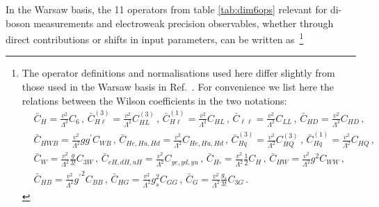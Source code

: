 \documentclass[../report.tex]{subfiles}
\begin{document}
In the Warsaw basis, the 11 operators from table \ref{tab:dim6ops} relevant for di-boson measurements and electroweak precision observables, 
whether through direct contributions or shifts in input parameters, can be written as~\footnote{The operator definitions and normalisations used here differ slightly from those used in the Warsaw basis in Ref.~\cite{Ellis:2018gqa}. For convenience we list here the relations between the Wilson coefficients in the two notations:
%
\begin{align*}
&\bar{C}_H = \frac{v^2}{\Lambda^2}C_6  \, , \,  \bar{C}_{H\ell}^{(3)} = \frac{v^2}{\Lambda^2} C_{HL}^{(3)}  \, , \, \bar{C}_{H\ell}^{(1)} = \frac{v^2}{\Lambda^2} C_{HL}  \, , \,  \bar{C}_{\ell\ell} = \frac{v^2}{\Lambda^2} C_{LL}  \, , \,  \bar{C}_{HD} = \frac{v^2}{\Lambda^2} C_{HD}  \, , \, \\ 
& \bar{C}_{HWB} = \frac{v^2}{\Lambda^2} g g^\prime C_{WB}  \, , \,  \bar{C}_{He,Hu,Hd} = \frac{v^2}{\Lambda^2} C_{He,Hu,Hd}  \, , \,  \bar{C}_{Hq}^{(3)} = \frac{v^2}{\Lambda^2} C_{HQ}^{(3)} \, , \, \bar{C}_{Hq}^{(1)} = \frac{v^2}{\Lambda^2} C_{HQ}  \, , \,  \\
& \bar{C}_W = \frac{v^2}{\Lambda^2} \frac{g}{3!} C_{3W} \, , \,  \bar{C}_{eH, dH, uH} = \frac{v^2}{\Lambda^2} C_{ye, yd, yu}  \, , \, \bar{C}_{H\square} = \frac{v^2}{\Lambda^2}  \frac{1}{2} C_H \, , \,  \bar{C}_{HW} = \frac{v^2}{\Lambda^2} g^2 C_{WW}  \, , \, \\
& \bar{C}_{HB} = \frac{v^2}{\Lambda^2} {g^\prime}^2 C_{BB}  \, , \, \bar{C}_{HG} = \frac{v^2}{\Lambda^2} g_s^2 C_{GG}  \, , \,  \bar{C}_G = \frac{v^2}{\Lambda^2} \frac{g_s}{3!} C_{3G}  \, .
\end{align*}
}  
%
\end{document}
